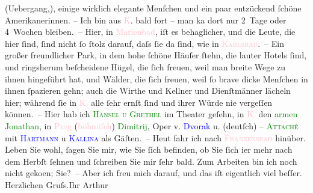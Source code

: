                     (Uebergang,), einige wirklich elegante Menſchen und ein paar entzückend ſchöne
                    Amerikanerinnen. – Ich bin aus \textcolor{pink}{\textsc{K}}{}\ledrightnote{\textcolor{pink}{Karlsbad}}. {\pb}bald fort – man ka{\geminationn} dort nur 2 Tage oder 4 Wochen bleiben. – Hier,
                    in \textcolor{pink}{Marienbad}{}\ledrightnote{\textcolor{pink}{Marienbad}}, iſt es behaglicher, und die
                    Leute, die hier ſind, ſind nicht ſo ſtolz darauf, daſs ſie da ſind, wie in
                        \textcolor{pink}{\textsc{Karlsbad}}{}\ledrightnote{\textcolor{pink}{Karlsbad}}. – Ein großer freundlicher Park, in dem hohe ſchöne Häuſer ſtehn,
                    die lauter Hotels ſind, und ringsherum beſcheidene Hügel, die ſich freuen, weil
                    man breite Wege zu ihnen hingeführt hat, und Wälder, die ſich freuen, weil ſo
                    brave dicke Menſchen in ihnen ſpazieren gehn; auch die Wirthe und Kellner {\pb}und Dienſtmänner lächeln hier; während ſie in
                        \textcolor{pink}{\textsc{K.}}{}\ledrightnote{\textcolor{pink}{Karlsbad}} alle ſehr ernſt ſind und ihrer Würde nie vergeſſen können. – Hier
                    hab ich \textcolor{green}{\textsc{Hänsel u
                        Grethel}}{}\ledrightnote{\textcolor{green}{Hänsel und Grethel}} im Theater geſehn, in \textcolor{pink}{\textsc{K.}}{}\ledrightnote{\textcolor{pink}{Karlsbad}} den \textcolor{green}{armen Jonathan}{}\ledrightnote{\textcolor{green}{Der arme Jonathan}}, in
                        \textcolor{pink}{Prag}{}\ledrightnote{\textcolor{pink}{Prag}} (\textcolor{pink}{böhmiſch}{}\ledrightnote{\textcolor{pink}{Böhmen}}) \textcolor{green}{Dimitrij}{}\ledrightnote{\textcolor{green}{Dimitrij}}, Oper v.
                        \textcolor{blue}{Dvorak}{}\ledrightnote{\textcolor{blue}{Antonín Dvořák}} u. (deutſch) – \textcolor{green}{\textsc{Attaché}}{}\ledrightnote{\textcolor{green}{Ein Attaché}} mit \textcolor{blue}{\textsc{Hartmann}}{}\ledrightnote{\textcolor{blue}{Ernst Hartmann}} u \textcolor{blue}{\textsc{Kallina}}{}\ledrightnote{\textcolor{blue}{Anna Kallina}} als Gäſten. –\pend
           \pstart
           Heut fahr ich nach \textcolor{pink}{\textsc{Franzensbad}}{}\ledrightnote{\textcolor{pink}{Franzensbad}} hinüber.\pend
           \pstart
           Leben Sie wohl, ſagen Sie mir, wie Sie ſich befinden, ob Sie ſich i{\geminationm}er mehr nach dem Herbſt ſehnen und ſchreiben Sie
                    mir ſehr bald. Zum Arbeiten bin ich noch {\pb}nicht
                        geko{\geminationm}en; Sie? – Aber ich freu mich darauf, und
                    das iſt eigentlich viel beſſer.\pend
           \pstart Herzlichen Gruſs.\hspace*{2em}Ihr
                        \spacefill\mbox{Arthur}\pend{}\endnumbering{}  
      